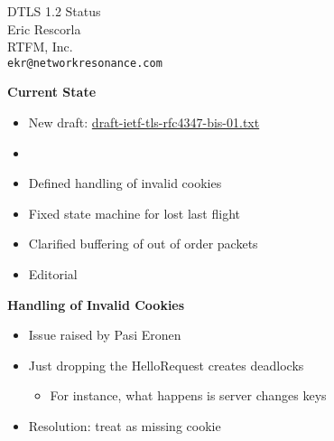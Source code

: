 \documentclass[helvetica]{seminar}
\newcommand{\heading}[1]{%
  \begin{center} 
    \large\bf 
    #1 
  \end{center} 
  \vspace{.4 in}}
\begin{document}
        
\begin{slide}
\begin{center}
\LARGE{{\bf}DTLS 1.2 Status}\\

\vspace{.3 in}
\large{Eric Rescorla}\\
\large{RTFM, Inc.}\\
\large{\texttt{ekr@networkresonance.com}}
\end{center}
\end{slide}


\begin{slide}
\heading{Current State}

\begin{itemize}
\item New draft: \url{draft-ietf-tls-rfc4347-bis-01.txt}
\item[]
\item Defined handling of invalid cookies
\item Fixed state machine for lost last flight
\item Clarified buffering of out of order packets
\item Editorial 
\end{itemize}

\end{slide}



\begin{slide}
\heading{Handling of Invalid Cookies}

\begin{itemize}
\item Issue raised by Pasi Eronen
\item Just dropping the \textsf{HelloRequest} creates deadlocks
\begin{itemize}
\item For instance, what happens is server changes keys
\end{itemize}
\item Resolution: treat as missing cookie
\end{itemize}
\end{slide}
\end{document}
